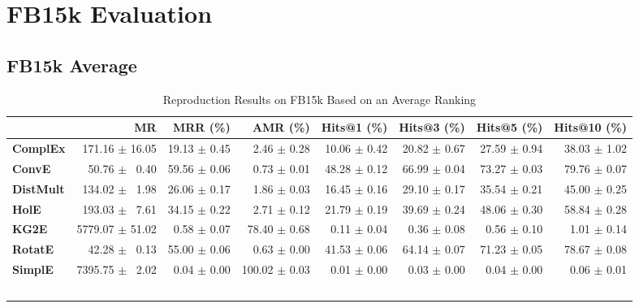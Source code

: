 \documentclass[journal]{IEEEtran}
\begin{document}
\section{FB15k Evaluation}
\subsection{FB15k Average}
\begin{table*}
    \caption{Reproduction Results on FB15k Based on an Average Ranking}
    \label{tab:fb15k_full_results_average_ranking}
    \centering
    \begin{tabular}{lrrrrrrr}
\toprule
{} &               MR &      MRR (\%) &       AMR (\%) &   Hits@1 (\%) &   Hits@3 (\%) &   Hits@5 (\%) &  Hits@10 (\%) \\
\midrule
\textbf{ComplEx } &  $\phantom{5}$171.16 $\pm$ 16.05 &  19.13 $\pm$ 0.45 &  $\phantom{5}$$\phantom{5}$2.46 $\pm$ 0.28 &  10.06 $\pm$ 0.42 &  20.82 $\pm$ 0.67 &  27.59 $\pm$ 0.94 &  38.03 $\pm$ 1.02 \\
\textbf{ConvE   } &  $\phantom{5}$$\phantom{5}$50.76 $\pm$ $\phantom{5}$0.40 &  59.56 $\pm$ 0.06 &  $\phantom{5}$$\phantom{5}$0.73 $\pm$ 0.01 &  48.28 $\pm$ 0.12 &  66.99 $\pm$ 0.04 &  73.27 $\pm$ 0.03 &  79.76 $\pm$ 0.07 \\
\textbf{DistMult} &  $\phantom{5}$134.02 $\pm$ $\phantom{5}$1.98 &  26.06 $\pm$ 0.17 &  $\phantom{5}$$\phantom{5}$1.86 $\pm$ 0.03 &  16.45 $\pm$ 0.16 &  29.10 $\pm$ 0.17 &  35.54 $\pm$ 0.21 &  45.00 $\pm$ 0.25 \\
\textbf{HolE    } &  $\phantom{5}$193.03 $\pm$ $\phantom{5}$7.61 &  34.15 $\pm$ 0.22 &  $\phantom{5}$$\phantom{5}$2.71 $\pm$ 0.12 &  21.79 $\pm$ 0.19 &  39.69 $\pm$ 0.24 &  48.06 $\pm$ 0.30 &  58.84 $\pm$ 0.28 \\
\textbf{KG2E    } &  5779.07 $\pm$ 51.02 &  $\phantom{5}$0.58 $\pm$ 0.07 &  $\phantom{5}$78.40 $\pm$ 0.68 &  $\phantom{5}$0.11 $\pm$ 0.04 &  $\phantom{5}$0.36 $\pm$ 0.08 &  $\phantom{5}$0.56 $\pm$ 0.10 &  $\phantom{5}$1.01 $\pm$ 0.14 \\
\textbf{RotatE  } &  $\phantom{5}$$\phantom{5}$42.28 $\pm$ $\phantom{5}$0.13 &  55.00 $\pm$ 0.06 &  $\phantom{5}$$\phantom{5}$0.63 $\pm$ 0.00 &  41.53 $\pm$ 0.06 &  64.14 $\pm$ 0.07 &  71.23 $\pm$ 0.05 &  78.67 $\pm$ 0.08 \\
\textbf{SimplE  } &  7395.75 $\pm$ $\phantom{5}$2.02 &  $\phantom{5}$0.04 $\pm$ 0.00 &  100.02 $\pm$ 0.03 &  $\phantom{5}$0.01 $\pm$ 0.00 &  $\phantom{5}$0.03 $\pm$ 0.00 &  $\phantom{5}$0.04 $\pm$ 0.00 &  $\phantom{5}$0.06 $\pm$ 0.01 \\
$$
\end{tabular}
\end{table*}
\end{document}
